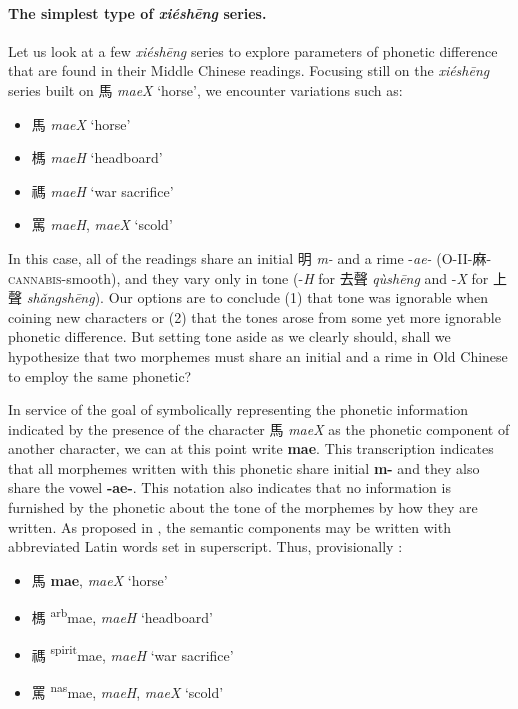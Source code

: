 \paragraph{The simplest type of \textit{xiéshēng} series.}
\label{par:simplest-XS-series}
Let us look at a few \textit{xiéshēng} series to explore parameters of phonetic difference that are found in their Middle Chinese readings. Focusing still on the \textit{xiéshēng} series built on 馬 \textit{maeX} `horse', we encounter variations such as:

\begin{itemize}
\item {\Large{馬}} \textit{maeX} `horse'
\item {\Large{榪}} \textit{maeH} `headboard'
\item {\Large{禡}} \textit{maeH} `war sacrifice'
\item {\Large{罵}} \textit{maeH}, \textit{maeX} `scold'
\end{itemize}

\noindent In this case, all of the readings share an initial 明 \textit{m-} and a rime -\textit{ae-} (O-II-麻-\textsc{cannabis}-smooth), and they vary only in tone (-\textit{H} for 去聲 \textit{qùshēng} and -\textit{X} for 上聲 \textit{shǎngshēng}).
Our options are to conclude (1) that tone was ignorable when coining new characters or (2) that the tones arose from some yet more ignorable phonetic difference. But setting tone aside as we clearly should, shall we hypothesize that two morphemes must share an initial and a rime in Old Chinese to employ the same phonetic? 

In service of the goal of symbolically representing the phonetic information indicated by the presence of the character 馬 \textit{maeX} as the phonetic component of another character, we can at this point write \textbf{mae}.  This transcription indicates that all morphemes written with this phonetic share initial \textbf{m-} and they also share the vowel \textbf{-ae-}. This notation also indicates that no information is furnished by the phonetic about the tone of the morphemes by how they are written. As proposed in \cite{hill_proposal_2015}, the semantic components may be written with abbreviated Latin words set in superscript. Thus, provisionally : 

\begin{itemize}
\item {\Large{馬}} \textbf{{\large{mae}}}, \textit{maeX} `horse'
\item {\Large{榪}} {\large{{\textsuperscript{arb}}mae}}, \textit{maeH} `headboard'
\item {\Large{禡}} {\large{{\textsuperscript{spirit}}mae}}, \textit{maeH} `war sacrifice'
\item {\Large{罵}} {\large{{\textsuperscript{nas}}mae}}, \textit{maeH}, \textit{maeX} `scold'
\end{itemize}

